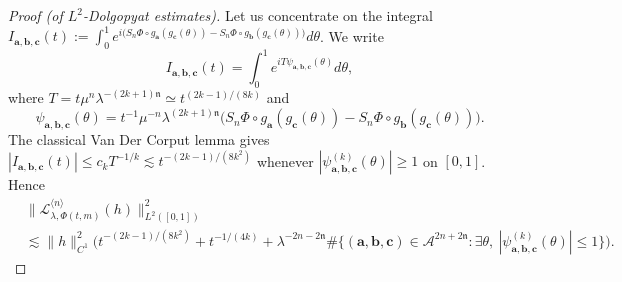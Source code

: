\documentclass[11pt]{amsart}
\theoremstyle{plain}
\theoremstyle{definition}
\numberwithin{equation}{section}
\begin{document}
\begin{proof}[Proof (of $L^2$-Dolgopyat estimates)]
Let us concentrate on the integral $I_{\mathbf{a},\mathbf{b},\mathbf{c}}(t):=\int_0^1 e^{i \big( S_n \Phi \circ g_\mathbf{a}(g_\mathbf{c}(\theta)) - S_n \Phi \circ g_\mathbf{b}(g_\mathbf{c}(\theta)) \big)}d\theta$. We write
$$
I_{\mathbf{a},\mathbf{b},\mathbf{c}}(t)=\int_0^1 e^{iT\psi_{\mathbf{a},\mathbf{b},\mathbf{c}}(\theta)}d\theta,
$$
where $T=t\mu^n\lambda^{-(2k+1)\mathfrak n}\simeq t^{(2k-1)/(8k)}$ and
$$
\psi_{\mathbf{a},\mathbf{b},\mathbf{c}}(\theta)=t^{-1}\mu^{-n}\lambda^{(2k+1)\mathfrak n}\big(S_n\Phi\circ g_{\mathbf a}(g_{\mathbf c}(\theta))-S_n\Phi\circ g_{\mathbf b}(g_{\mathbf c}(\theta))\big).
$$
The classical Van Der Corput lemma gives $|I_{\mathbf{a},\mathbf{b},\mathbf{c}}(t)|\leq c_kT^{-1/k}\lesssim t^{-(2k-1)/(8k^2)}$ whenever $|\psi_{\mathbf{a},\mathbf{b},\mathbf{c}}^{(k)}(\theta)|\geq1$ on $[0,1]$. Hence
\begin{align*}
& \Big\| \mathcal{L}_{\lambda,\Phi(t,m)}^{\langle n \rangle}(h) \Big\|_{L^2([0,1])}^2 \\
& \lesssim \|h\|_{C^1}^2 \Big(t^{-(2k-1)/(8k^2)}+t^{-1/(4k)}+\lambda^{-2n-2\mathfrak n}\#\{(\mathbf a,\mathbf b,\mathbf c)\in\mathcal A^{2n+2\mathfrak n}:\exists\theta,\ |\psi_{\mathbf a,\mathbf b,\mathbf c}^{(k)}(\theta)|\leq1\}\Big).
\end{align*}


\end{proof}
\end{document}
